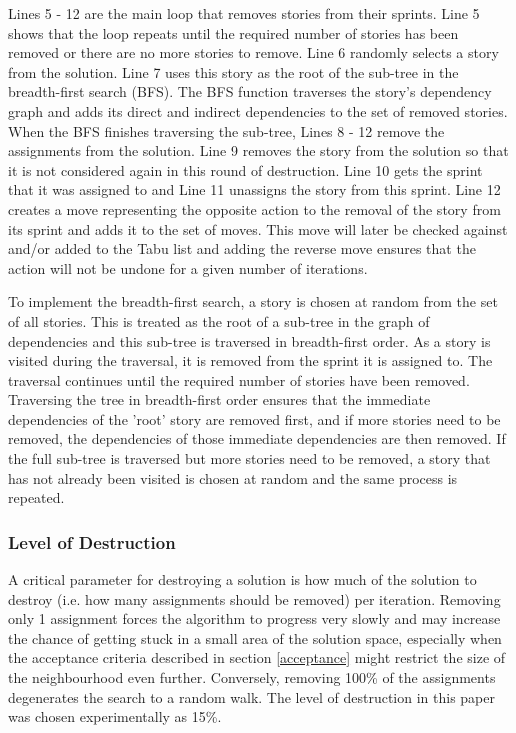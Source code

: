 Lines 5 - 12 are the main loop that removes stories from their sprints. Line 5 shows that the loop repeats until the required number of stories has been removed or there are no more stories to remove. Line 6 randomly selects a story from the solution. Line 7 uses this story as the root of the sub-tree in the breadth-first search (BFS). The BFS function traverses the story's dependency graph and adds its direct and indirect dependencies to the set of removed stories. When the BFS finishes traversing the sub-tree, Lines 8 - 12 remove the assignments from the solution. Line 9 removes the story from the solution so that it is not considered again in this round of destruction. Line 10 gets the sprint that it was assigned to and Line 11 unassigns the story from this sprint. Line 12 creates a move representing the opposite action to the removal of the story from its sprint and adds it to the set of moves. This move will later be checked against and/or added to the Tabu list and adding the reverse move ensures that the action will not be undone for a given number of iterations.

To implement the breadth-first search, a story is chosen at random from the set of all stories. This is treated as the root of a sub-tree in the graph of dependencies and this sub-tree is traversed in breadth-first order. As a story is visited during the traversal, it is removed from the sprint it is assigned to. The traversal continues until the required number of stories have been removed. Traversing the tree in breadth-first order ensures that the immediate dependencies of the 'root' story are removed first, and if more stories need to be removed, the dependencies of those immediate dependencies are then removed. If the full sub-tree is traversed but more stories need to be removed, a story that has not already been visited is chosen at random and the same process is repeated.

\subsubsection{Level of Destruction}

A critical parameter for destroying a solution is how much of the solution to destroy (i.e. how many assignments should be removed) per iteration. Removing only 1 assignment forces the algorithm to progress very slowly and may increase the chance of getting stuck in a small area of the solution space, especially when the acceptance criteria described in section \ref{acceptance} might restrict the size of the neighbourhood even further. Conversely, removing 100\% of the assignments degenerates the search to a random walk. The level of destruction in this paper was chosen experimentally as 15\%.

